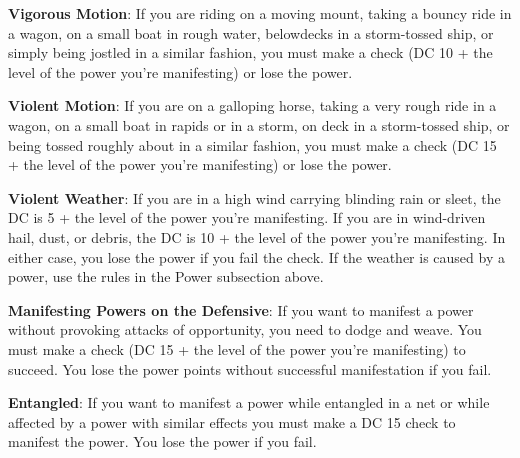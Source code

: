 \textbf{Vigorous Motion}: If you are riding on a moving mount, taking a bouncy ride in a wagon, on a small boat in rough water, belowdecks in a storm-tossed ship, or simply being jostled in a similar fashion, you must make a  check (DC 10 + the level of the power you're manifesting) or lose the power.

\textbf{Violent Motion}: If you are on a galloping horse, taking a very rough ride in a wagon, on a small boat in rapids or in a storm, on deck in a storm-tossed ship, or being tossed roughly about in a similar fashion, you must make a  check (DC 15 + the level of the power you're manifesting) or lose the power.

\textbf{Violent Weather}: If you are in a high wind carrying blinding rain or sleet, the DC is 5 + the level of the power you're manifesting. If you are in wind-driven hail, dust, or debris, the DC is 10 + the level of the power you're manifesting. In either case, you lose the power if you fail the  check. If the weather is caused by a power, use the rules in the Power subsection above.

\textbf{Manifesting Powers on the Defensive}: If you want to manifest a power without provoking attacks of opportunity, you need to dodge and weave. You must make a  check (DC 15 + the level of the power you're manifesting) to succeed. You lose the power points without successful manifestation if you fail.

\textbf{Entangled}: If you want to manifest a power while entangled in a net or while affected by a power with similar effects you must make a DC 15  check to manifest the power. You lose the power if you fail.